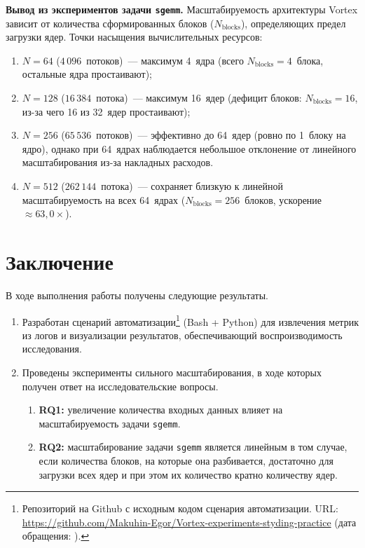 \documentclass[a4paper]{article}
\begin{document}
\textbf{Вывод из экспериментов задачи \texttt{sgemm}.}
Масштабируемость архитектуры Vortex зависит от количества сформированных блоков ($N_{\text{blocks}}$), определяющих предел загрузки ядер.
Точки насыщения вычислительных ресурсов:
\begin{enumerate}
    \item $N = 64$ ($4\,096$~потоков)~--- максимум 4~ядра (всего $N_{\text{blocks}} = 4$~блока, остальные ядра простаивают);
    \item $N = 128$ ($16\,384$~потока)~--- максимум 16~ядер (дефицит блоков: $N_{\text{blocks}} = 16$, из-за чего 16 из 32~ядер простаивают);
    \item $N = 256$ ($65\,536$~потоков)~--- эффективно до 64~ядер (ровно по 1~блоку на ядро), однако при 64~ядрах наблюдается небольшое отклонение от линейного масштабирования из-за накладных расходов.
    \item $N = 512$ ($262\,144$~потока)~--- сохраняет близкую к линейной масштабируемость на всех 64~ядрах ($N_{\text{blocks}} = 256$~блоков, ускорение $\approx 63{,}0\times$).
\end{enumerate}

\section{Заключение}

В ходе выполнения работы получены следующие результаты.
\begin{enumerate}
    \item Разработан сценарий автоматизации\footnote{Репозиторий на Github с исходным кодом сценария автоматизации. URL: \url{https://github.com/Makuhin-Egor/Vortex-experiments-styding-practice} (дата обращения: ).} (Bash + Python) для извлечения метрик из логов и визуализации результатов, обеспечивающий воспроизводимость исследования.
    \item Проведены эксперименты сильного масштабирования, в ходе которых получен ответ на исследовательские вопросы.
    \begin{enumerate}
        \item \textbf{RQ1:} увеличение количества входных данных влияет на масштабируемость задачи \texttt{sgemm}. 
        \item \textbf{RQ2:} масштабирование задачи \texttt{sgemm} является линейным в том случае, если количества блоков, на которые она разбивается, достаточно для загрузки всех ядер и при этом их количество кратно количеству ядер.
    \end{enumerate}
\end{enumerate}
\end{document}
